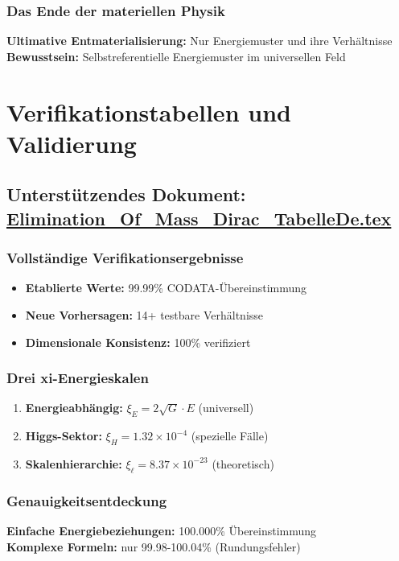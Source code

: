 \documentclass[12pt,a4paper]{report}
\begin{document}
	\subsubsection{Das Ende der materiellen Physik}
	\textbf{Ultimative Entmaterialisierung:} Nur Energiemuster und ihre Verhältnisse\\
	\textbf{Bewusstsein:} Selbstreferentielle Energiemuster im universellen Feld
	
	\section{Verifikationstabellen und Validierung}
	\subsection{Unterstützendes Dokument: \href{https://github.com/jpascher/T0-Time-Mass-Duality/tree/main/2/pdf/Elimination_Of_Mass_Dirac_TabelleDe.pdf}{Elimination\_Of\_Mass\_Dirac\_TabelleDe.tex}}
	
	\subsubsection{Vollständige Verifikationsergebnisse}
	\begin{itemize}
		\item \textbf{Etablierte Werte:} 99.99\% CODATA-Übereinstimmung
		\item \textbf{Neue Vorhersagen:} 14+ testbare Verhältnisse
		\item \textbf{Dimensionale Konsistenz:} 100\% verifiziert
	\end{itemize}
	
	\subsubsection{Drei xi-Energieskalen}
	\begin{enumerate}
		\item \textbf{Energieabhängig:} $\xi_E = 2\sqrt{G} \cdot E$ (universell)
		\item \textbf{Higgs-Sektor:} $\xi_H = 1.32 \times 10^{-4}$ (spezielle Fälle)
		\item \textbf{Skalenhierarchie:} $\xi_\ell = 8.37 \times 10^{-23}$ (theoretisch)
	\end{enumerate}
	
	\subsubsection{Genauigkeitsentdeckung}
	\textbf{Einfache Energiebeziehungen:} 100.000\% Übereinstimmung\\
	\textbf{Komplexe Formeln:} nur 99.98-100.04\% (Rundungsfehler)
	
\end{document}
